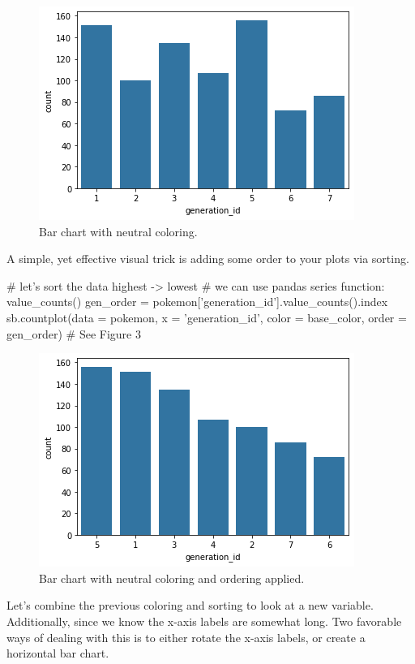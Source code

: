 \begin{figure}
	\includegraphics{images/figure2.png}
	\caption{Bar chart with neutral coloring.}\label{fig:figure2}
\end{figure}

A simple, yet effective visual trick is adding some order to your plots via sorting.

\begin{python}
	# let's sort the data highest -> lowest
	# we can use pandas series function: value_counts()
	gen_order = pokemon['generation_id'].value_counts().index
	sb.countplot(data = pokemon, x = 'generation_id', color = base_color, order = gen_order)
	# See Figure 3
\end{python}

\begin{figure}
	\includegraphics{images/figure3.png}
	\caption{Bar chart with neutral coloring and ordering applied.}\label{fig:figure3}
\end{figure}

Let's combine the previous coloring and sorting to look at a new variable. Additionally, since we know the x-axis labels are somewhat long. Two favorable ways of dealing with this is to either rotate the x-axis labels, or create a horizontal bar chart.

